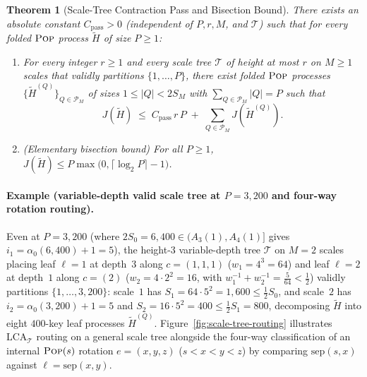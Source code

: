 \documentclass[11pt]{article}
\newtheorem{theorem}{Theorem}[section]
\theoremstyle{definition}
\theoremstyle{remark}
\newcommand{\LCA}{\mathrm{LCA}}
\newcommand{\sep}{\mathrm{sep}}
\newcommand{\POP}{\textnormal{\scshape Pop}}
\begin{document}
\begin{theorem}[Scale-Tree Contraction Pass and Bisection Bound]
\label{thm:mod3-pass}
There exists an absolute constant $C_{\mathrm{pass}} > 0$ (independent of $P, r, M$, and $\mathcal{T}$) such that for every folded $\POP$ process $\widetilde{H}$ of size $P \ge 1$:
\begin{enumerate}[label=(\arabic*)]
  \item For every integer $r \ge 1$ and every scale tree $\mathcal{T}$ of height at most $r$ on $M \ge 1$ scales that validly partitions $\{1, \dots, P\}$, there exist folded $\POP$ processes $\{\widetilde{H}^{(Q)}\}_{Q \in \mathcal{P}_M}$ of sizes $1 \le |Q| < 2 S_M$ with $\sum_{Q \in \mathcal{P}_M} |Q| = P$ such that
  \[
  J(\widetilde{H}) \;\le\; C_{\mathrm{pass}}\,r\,P \;+\; \sum_{Q \in \mathcal{P}_M} J(\widetilde{H}^{(Q)}).
  \]
  \item \emph{(Elementary bisection bound)} For all $P \ge 1$, $J(\widetilde{H}) \le P \max\big(0, \lceil \log_2 P \rceil - 1\big)$.
\end{enumerate}
\end{theorem}

\paragraph{Example (variable-depth valid scale tree at $P = 3{,}200$ and four-way rotation routing).}
Even at $P = 3{,}200$ (where $2 S_0 = 6{,}400 \in (A_3(1), A_4(1)]$ gives $i_1 = \alpha_0(6{,}400) + 1 = 5$), the height-$3$ variable-depth tree $\mathcal{T}$ on $M = 2$ scales placing leaf $\ell = 1$ at depth~$3$ along $c = (1, 1, 1)$ ($w_1 = 4^3 = 64$) and leaf $\ell = 2$ at depth~$1$ along $c = (2)$ ($w_2 = 4 \cdot 2^2 = 16$, with $w_1^{-1} + w_2^{-1} = \frac{5}{64} < \frac{1}{2}$) validly partitions $\{1, \dots, 3{,}200\}$: scale~$1$ has $S_1 = 64 \cdot 5^2 = 1{,}600 \le \frac{1}{2} S_0$, and scale~$2$ has $i_2 = \alpha_0(3{,}200) + 1 = 5$ and $S_2 = 16 \cdot 5^2 = 400 \le \frac{1}{2} S_1 = 800$, decomposing $\widetilde{H}$ into eight $400$-key leaf processes $\widetilde{H}^{(Q)}$. Figure~\ref{fig:scale-tree-routing} illustrates $\LCA_{\mathcal{T}}$ routing on a general scale tree alongside the four-way classification of an internal $\POP(s)$ rotation $e = (x, y, z)$ ($s < x < y < z$) by comparing $\sep(s, x)$ against $\ell = \sep(x, y)$.
\end{document}
